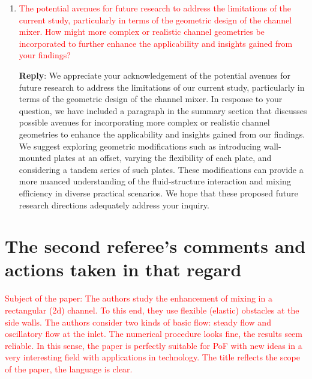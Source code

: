 \documentclass[onecolumn,a4paper,amsmath,amssym,pre]{revtex4}
\begin{document}
\begin{enumerate}
					\item \textcolor{red}{The potential avenues for future research to address the limitations of the current study, particularly in terms of the geometric design of the channel mixer. How might more complex or realistic channel geometries be incorporated to further enhance the applicability and insights gained from your findings?}
					
					\textbf{Reply}: We appreciate your acknowledgement of the potential avenues for future research to address the limitations of our current study, particularly in terms of the geometric design of the channel mixer. In response to your question, we have included a paragraph in the summary section that discusses possible avenues for incorporating more complex or realistic channel geometries to enhance the applicability and insights gained from our findings. We suggest exploring geometric modifications such as introducing wall-mounted plates at an offset, varying the flexibility of each plate, and considering a tandem series of such plates. These modifications can provide a more nuanced understanding of the fluid-structure interaction and mixing efficiency in diverse practical scenarios.
					We hope that these proposed future research directions adequately address your inquiry.
				\end{enumerate}	
				
				\newpage	
				
				\section*{The second referee's comments and actions taken in that regard} 
				
				\textcolor{red}{Subject of the paper: The authors study the enhancement of mixing in a rectangular (2d) channel. To this end, they use flexible (elastic) obstacles at the side walls. The authors consider two kinds of basic flow: steady flow and oscillatory flow at the inlet. The numerical procedure looks fine, the results seem reliable. In this sense, the paper is perfectly suitable for PoF with new ideas in a very interesting field with applications in technology. The title reflects the scope of the paper, the language is clear.}\\
				
\end{document}
